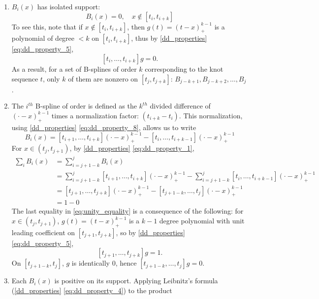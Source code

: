 \documentclass[12pt]{article}
\theoremstyle{definition}
\begin{document}
\begin{enumerate} \label{eq:BS_properties}
\item \label{eq:BS_property_1} $B_i\left(x\right)$ has isolated support:
\[
B_i\left(x\right) = 0, \quad x \not \in \left[t_{i},t_{i+k}\right]
\]
To see this, note that if $x \not \in \left[t_{i},t_{i+k}\right]$, then $g\left(t \right) = \left(t-x\right)^{k-1}_+$ is a polynomial of degree $< k$ on $\left[t_{i},t_{i+k}\right]$, thus by \ref{dd_properties} \ref{eq:dd_property_5},
\[
\left[t_{i},\dots,t_{i+k}\right]g = 0.
\]
As a result, for a set of B-splines of order $k$ corresponding to the knot sequence $t$, only $k$ of them are nonzero on $\left[t_{j},t_{j+k}\right]$: $B_{j-k+1},B_{j-k+2},\dots,B_{j}$.
\item \label{eq:BS_property_2} The $i^{th}$ B-spline of order is defined as the $k^{th}$ divided difference of $\left(\cdot - x\right)_+^{k-1}$ times a normalization factor: $\left(t_{i+k}-t_i\right)$. This normalization, using \ref{dd_properties} \ref{eq:dd_property_8}, allows us to write 
\begin{equation} \label{eq:BS_norm_rr}
B_i\left(x\right)=\left[t_{i+1},\dots,t_{i+k} \right]\left(\cdot - x\right)_+^{k-1} - \left[t_{i},\dots,t_{i+k-1} \right]\left(\cdot - x\right)_+^{k-1}
\end{equation}
For $x \in \left(t_{j},t_{j+1}\right)$, by \ref{dd_properties} \ref{eq:dd_property_1},
\begin{align}
\sum_{i} B_i\left(x\right) &=  \sum_{i=j+1-k}^{j} B_i\left(x\right) \nonumber\\
&= \sum_{i=j+1-k}^{j} \left[t_{i+1},\dots,t_{i+k} \right] \left(\cdot - x\right)_+^{k-1} - \sum_{i=j+1-k}^{j} \left[t_{i},\dots,t_{i+k-1} \right] \left(\cdot - x\right)_+^{k-1} \nonumber \\
&= \left[t_{j+1},\dots,t_{j+k} \right] \left(\cdot - x\right)_+^{k-1} - \left[t_{j+1-k},\dots,t_{j} \right] \left(\cdot - x\right)_+^{k-1} \nonumber \\
&= 1 - 0 \label{eq:unity_equality}
\end{align}
The last equality in \ref{eq:unity_equality} is a consequence of the following: for $x \in \left(t_j,t_{j+1}\right)$, $g\left(t\right)=\left(t - x\right)_+^{k-1}$ is a $k-1$ degree polynomial with unit leading coefficient on $\left[ t_{j+1},t_{j+k} \right]$, so by \ref{dd_properties} \ref{eq:dd_property_5}, 
\[
\left[ t_{j+1},\dots,t_{j+k} \right]g=1.
\]
On $\left[ t_{j+1-k},t_{j} \right]$, $g$ is identically $0$, hence $\left[ t_{j+1-k},\dots,t_{j} \right]g = 0$.   
\item \label{eq:BS_property_3}Each $B_i\left(x\right)$ is positive on its support. Applying Leibnitz's formula (\ref{dd_properties} \ref{eq:dd_property_4}) to the product

\end{enumerate}
\end{document}

